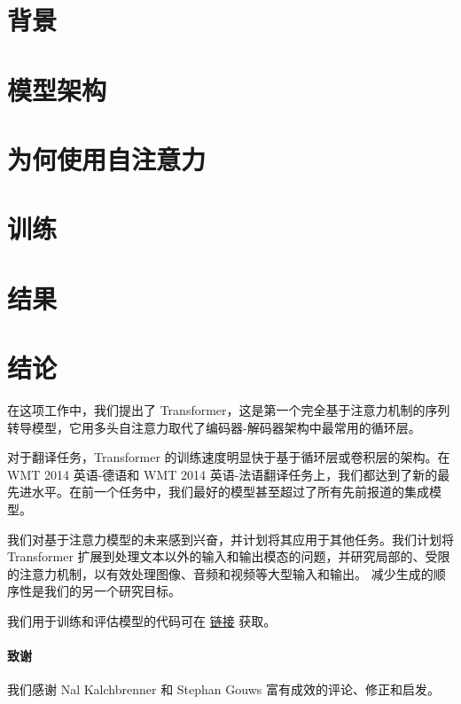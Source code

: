 \documentclass{article}
\begin{document}


\section{背景}



\section{模型架构}


\section{为何使用自注意力}


\section{训练}


\section{结果} \label{sec:results}


\section{结论}
在这项工作中，我们提出了 Transformer，这是第一个完全基于注意力机制的序列转导模型，它用多头自注意力取代了编码器-解码器架构中最常用的循环层。

对于翻译任务，Transformer 的训练速度明显快于基于循环层或卷积层的架构。在 WMT 2014 英语-德语和 WMT 2014 英语-法语翻译任务上，我们都达到了新的最先进水平。在前一个任务中，我们最好的模型甚至超过了所有先前报道的集成模型。%

我们对基于注意力模型的未来感到兴奋，并计划将其应用于其他任务。我们计划将 Transformer 扩展到处理文本以外的输入和输出模态的问题，并研究局部的、受限的注意力机制，以有效处理图像、音频和视频等大型输入和输出。
减少生成的顺序性是我们的另一个研究目标。

我们用于训练和评估模型的代码可在 \url{链接} 获取。

\paragraph{致谢} 我们感谢 Nal Kalchbrenner 和 Stephan Gouws 富有成效的评论、修正和启发。
\end{document}
